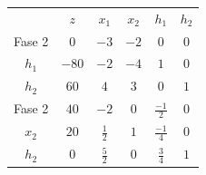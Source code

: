 \begin{center}
\begin{tabular}{c|c|cccc|}
 & $z$ & $x_1$ & $x_2$ & $h_1$ & $h_2$\\ 
Fase 2 & $0$ & $-3$ & $-2$ & $0$ & $0$ \\ 
\hline
$h_1$ & $-80$  & $-2$ & $-4$ & $1$ & $0$\\ 
$h_2$ & $60$  & $4$ & $3$ & $0$ & $1$\\ 
\hline
Fase 2 & $40$ & $-2$ & $0$ & $\frac{-1}{2}$ & $0$ \\ 
\hline
$x_2$ & $20$  & $\frac{1}{2}$ & $1$ & $\frac{-1}{4}$ & $0$\\ 
$h_2$ & $0$  & $\frac{5}{2}$ & $0$ & $\frac{3}{4}$ & $1$\\ 
\hline
\end{tabular}
\end{center}

